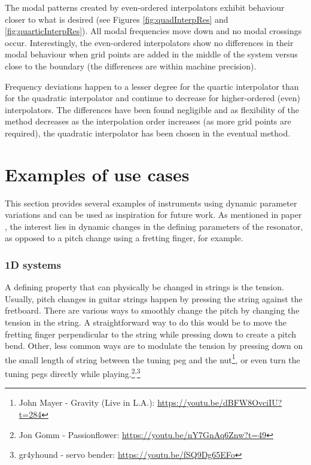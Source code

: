 The modal patterns created by even-ordered interpolators exhibit behaviour closer to what is desired (see Figures \ref{fig:quadInterpRes} and \ref{fig:quarticInterpRes}). All modal frequencies move down and no modal crossings occur. Interestingly, the even-ordered interpolators show no differences in their modal behaviour when grid points are added in the middle of the system versus close to the boundary (the differences are within machine precision).

Frequency deviations happen to a lesser degree for the quartic interpolator than for the quadratic interpolator and continue to decrease for higher-ordered (even) interpolators. The differences have been found negligible and as flexibility of the method decreases as the interpolation order increases (as more grid points are required), the quadratic interpolator has been chosen in the eventual method. 


\section{Examples of use cases}\label{sec:examples}
This section provides several examples of instruments using dynamic parameter variations and can be used as inspiration for future work. As mentioned in paper \citeP[G], the interest lies in dynamic changes in the defining parameters of the resonator, as opposed to a pitch change using a fretting finger, for example. 


\subsubsection{1D systems}
A defining property that can physically be changed in strings is the tension. Usually, pitch changes in guitar strings happen by pressing the string against the fretboard. There are various ways to smoothly change the pitch by changing the tension in the string. A straightforward way to do this would be to move the fretting finger perpendicular to the string while pressing down to create a pitch bend. Other, less common ways are to modulate the tension by pressing down on the small length of string between the tuning peg and the nut\footnote{John Mayer - Gravity (Live in L.A.): \url{https://youtu.be/dBFW8OvciIU?t=284}}, or even turn the tuning pegs directly while playing.\footnote{Jon Gomm - Passionflower: \url{https://youtu.be/nY7GnAq6Znw?t=49}}\textsuperscript{,}\footnote{gr4yhound - servo bender: \url{https://youtu.be/fSQ9Dg65EFo}}

